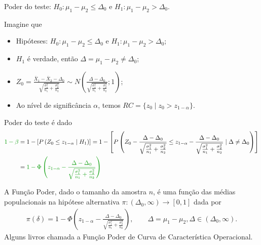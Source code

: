 \documentclass[9pt]{beamer}
\begin{document}
\begin{frame}{Poder do teste: $H_0:\mu_1 - \mu_2 \leq \Delta_0$ e $H_1: \mu_1 - \mu_2 > \Delta_0$.}

\tiny

Imagine que
\begin{itemize}
	\item Hipóteses: $H_0: \mu_1 - \mu_2 \leq \Delta_0$ e $H_1: \mu_1 -  \mu_2 > \Delta_0$;
	\item $H_1$ é verdade, então $\Delta = \mu_1-\mu_2 \neq \Delta_0$;
	\item $Z_0 = \frac{\bar{X}_1 - \bar{X}_2 - \Delta_0}{ \sqrt{ \frac{\sigma_1^2}{n_1} + \frac{\sigma_2^2}{n_2} } } \sim N\left( \frac{\Delta - \Delta_0}{ \sqrt{ \frac{\sigma_1^2}{n_1} + \frac{\sigma_2^2}{n_2} } } ; 1\right)$;
	\item Ao nível de significância $\alpha$, temos $RC = \{ z_0 \mid z_0 > z_{1-\alpha}  \}$.
\end{itemize}
\vfill	

Poder do teste é dado
\begin{align*}
\textcolor{important}{1-\beta} &=1 - \left[P\left( Z_0 \leq z_{1-\alpha} \mid H_1 \right)\right] = 1- \left[ P \left( Z_0 - \frac{\Delta - \Delta_0}{ \sqrt{ \frac{\sigma_1^2}{n_1} + \frac{\sigma_2^2}{n_2} } } \leq z_{1 - \alpha} - \frac{\Delta - \Delta_0}{ \sqrt{ \frac{\sigma_1^2}{n_1} + \frac{\sigma_2^2}{n_2} } } \mid \Delta \neq \Delta_0 \right)\right]\\
&= \textcolor{important}{1 - \Phi\left( z_{1-\alpha} - \frac{\Delta - \Delta_0}{ \sqrt{ \frac{\sigma_1^2}{n_1} + \frac{\sigma_2^2}{n_2} } } \right) }
\end{align*}
\vfill

A \textcolor{important}{Função Poder}, dado o tamanho da amostra $n$, é uma função das médias populacionais na hipótese alternativa  $\pi: (\Delta_0, \infty) \longrightarrow [0,1]$ dada por
\begin{align*}
\pi(\delta) = 1 - \Phi\left( z_{1-\alpha} - \frac{\Delta - \Delta_0}{ \sqrt{ \frac{\sigma_1^2}{n_1} + \frac{\sigma_2^2}{n_2} } } \right), \qquad \Delta = \mu_1 - \mu_2, \Delta \in (\Delta_0, \infty).
\end{align*}
Alguns livros chamada a Função Poder de \textcolor{important}{Curva de Característica Operacional.}

\normalsize

\end{frame}
\end{document}

